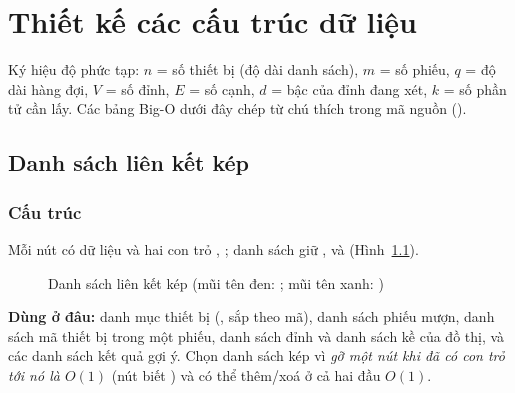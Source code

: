 \chapter{Thiết kế các cấu trúc dữ liệu}

Ký hiệu độ phức tạp: $n$ = số thiết bị (độ dài danh sách), $m$ = số phiếu, $q$ = độ dài hàng đợi, $V$ = số đỉnh, $E$ = số cạnh, $d$ = bậc của đỉnh đang xét, $k$ = số phần tử cần lấy. Các bảng Big-O dưới đây chép từ chú thích trong mã nguồn ().

\section{Danh sách liên kết kép }
\subsection{Cấu trúc}
Mỗi nút có dữ liệu và hai con trỏ , ; danh sách giữ ,  và  (Hình~\ref{fig:dll}).

\begin{figure}[H]
\centering
{}
\caption{Danh sách liên kết kép (mũi tên đen: ; mũi tên xanh: )}
\label{fig:dll}
\end{figure}

\textbf{Dùng ở đâu:} danh mục thiết bị (, sắp theo mã), danh sách phiếu mượn, danh sách mã thiết bị trong một phiếu, danh sách đỉnh và danh sách kề của đồ thị, và các danh sách kết quả gợi ý. Chọn danh sách kép vì \emph{gỡ một nút khi đã có con trỏ tới nó là $O(1)$} (nút biết ) và có thể thêm/xoá ở cả hai đầu $O(1)$.

